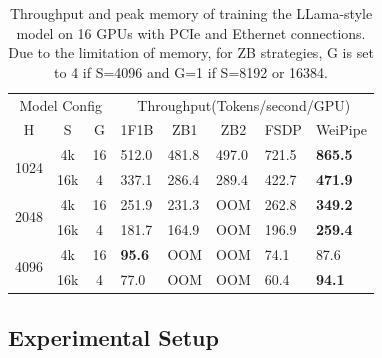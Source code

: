 \documentclass[sigplan,review]{acmart}
\begin{document}


\begin{table}[!ht]
\centering
\caption{Throughput and peak memory of training the LLama-style model on 16 GPUs with PCIe and Ethernet connections. Due to the limitation of memory, for ZB strategies, G is set to 4 if S=4096 and G=1 if S=8192 or 16384.}
\begin{tabular}{ccc|lllll}
\hline
\multicolumn{3}{c|}{Model Config}  & \multicolumn{5}{c}{Throughput(Tokens/second/GPU)}                                                                                      \\
H                     & S     & G  & \multicolumn{1}{c}{1F1B} & \multicolumn{1}{c}{ZB1} & \multicolumn{1}{c}{ZB2} & \multicolumn{1}{c}{FSDP} & \multicolumn{1}{c}{WeiPipe} \\ \hline
\multirow{2}{*}{1024} & 4k  & 16 & 512.0                    & 481.8                   & 497.0                   & 721.5                    & \textbf{865.5}              \\
                      & 16k & 4  & 337.1                    & 286.4                   & 289.4                   & 422.7                    & \textbf{471.9}              \\ \hline
\multirow{2}{*}{2048} & 4k  & 16 & 251.9                    & 231.3                   & OOM                     & 262.8                    & \textbf{349.2}              \\
                      & 16k & 4  & 181.7                    & 164.9                   & OOM                     & 196.9                    & \textbf{259.4}              \\ \hline
\multirow{2}{*}{4096} & 4k  & 16 & \textbf{95.6}                     & OOM                     & OOM                     & 74.1                     & 87.6               \\
                      & 16k & 4  & 77.0                     & OOM                     & OOM                     & 60.4                     & \textbf{94.1}               \\ \hline
\end{tabular}
\label{tab:perform_pcie}
\end{table}

\subsection{Experimental Setup}
\end{document}
